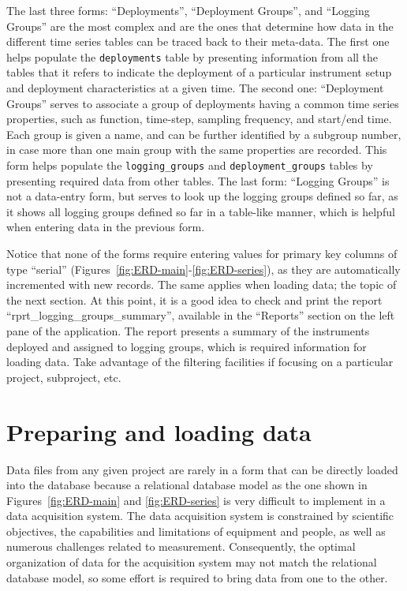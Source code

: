 \documentclass[12pt,letterpaper,titlepage,headings=small,numbers=noenddot]%
{scrartcl}
\begin{document}
The last three forms: ``Deployments'', ``Deployment Groups'', and ``Logging
Groups'' are the most complex and are the ones that determine how data in
the different time series tables can be traced back to their meta-data.
The first one helps populate the \texttt{deployments} table by presenting
information from all the tables that it refers to indicate the deployment
of a particular instrument setup and deployment characteristics at a given
time.  The second one: ``Deployment Groups'' serves to associate a group of
deployments having a common time series properties, such as function,
time-step, sampling frequency, and start/end time.  Each group is given a
name, and can be further identified by a subgroup number, in case more than
one main group with the same properties are recorded.  This form helps
populate the \texttt{logging\_groups} and \texttt{deployment\_groups}
tables by presenting required data from other tables.  The last form:
``Logging Groups'' is not a data-entry form, but serves to look up the
logging groups defined so far, as it shows all logging groups defined so
far in a table-like manner, which is helpful when entering data in the
previous form.

Notice that none of the forms require entering values for primary key
columns of type ``serial''
(Figures~\ref{fig:ERD-main}-\ref{fig:ERD-series}), as they are
automatically incremented with new records.  The same applies when loading
data; the topic of the next section.  At this point, it is a good idea to
check and print the report ``rprt\_logging\_groups\_summary'', available in
the ``Reports'' section on the left pane of the application.  The report
presents a summary of the instruments deployed and assigned to logging
groups, which is required information for loading data.  Take advantage of
the filtering facilities if focusing on a particular project, subproject,
etc.


\section{Preparing and loading data}
\label{sec:prep-load-data}

Data files from any given project are rarely in a form that can be directly
loaded into the database because a relational database model as the one
shown in Figures~\ref{fig:ERD-main} and \ref{fig:ERD-series} is very
difficult to implement in a data acquisition system.  The data acquisition
system is constrained by scientific objectives, the capabilities and
limitations of equipment and people, as well as numerous challenges related
to measurement.  Consequently, the optimal organization of data for the
acquisition system may not match the relational database model, so some
effort is required to bring data from one to the other.
\end{document}
